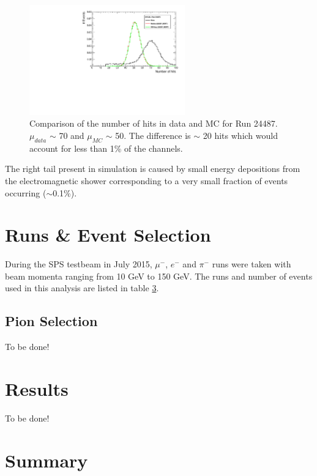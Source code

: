 \documentclass[twoside,a4paper,11pt]{article}
\begin{document}
\begin{figure}[htbp]
\begin{center}
\includegraphics[width=0.6\textwidth]{fig/Electrons_BeamProfile/Run24487_nHits_AHCAL_20GeV_Comparison.pdf}
\caption{Comparison of the number of hits in data and MC for Run 24487. $\mu_{data}$ $\sim$ 70 and $\mu_{MC}$ $\sim$ 50. The difference is $\sim$ 20 hits which would account for less than 1\% of the channels.}
\label{fig:nHitsEvent}
\end{center}
\end{figure}
The right tail present in simulation is caused by small energy depositions from the electromagnetic shower corresponding to a very small fraction of events occurring ($\sim$0.1\%).

\section{Runs \& Event Selection}
 
During the SPS testbeam in July 2015, $\mu^-$, $e^-$ and $\pi^-$ runs were taken with beam momenta ranging from 10 GeV to 150 GeV. 
The runs and number of events used in this analysis are listed in table \ref{}.

\subsection{Pion Selection}

To be done!

\section{Results}

To be done!

\section{Summary}
\end{document}

